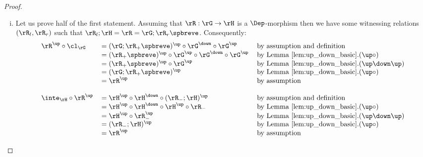 \documentclass{article}
\begin{document}
  \begin{proof}
  \item
  \begin{enumerate}[i.]
  \item
  Let us prove half of the first statement. Assuming that $\rR : \rG \to \rH$ is a $\Dep$-morphism then we have some witnessing relations $(\rR_l,\rR_r)$ such that $\rR_l ; \rH = \rR = \rG ; \rR_r\spbreve$. Consequently:
  \[
  \begin{tabular}{lll}
  $\rR^\up \circ \cl_\rG$
  &
  $= (\rG ; \rR_+\spbreve)^\up \circ \rG^\down \circ \rG^\up$
  & by assumption and definition
  \\&
  $= (\rR_+\spbreve)^\up \circ \rG^\up \circ \rG^\down \circ \rG^\up$
  & by Lemma \ref{lem:up_down_basic}.$(\up\circ)$
  \\&
  $= (\rR_+\spbreve)^\up \circ \rG^\up$
  & by Lemma \ref{lem:up_down_basic}.$(\up\down\up)$
  \\&
  $= (\rG ; \rR_+\spbreve)^\up$
  & by Lemma \ref{lem:up_down_basic}.$(\up\circ)$
  \\&
  $= \rR^\up$
  & by assumption
  \\
  \\
  $\inte_\rH \circ \rR^\up$
  &
  $= \rH^\up \circ \rH^\down \circ (\rR_- ; \rH)^\up$
  & by assumption and definition
  \\&
  $= \rH^\up \circ \rH^\down \circ \rH^\up \circ \rR_-$
  & by Lemma \ref{lem:up_down_basic}.$(\up\circ)$
  \\&
  $= \rH^\up \circ \rR_-^\up$
  & by Lemma \ref{lem:up_down_basic}.$(\up\down\up)$
  \\&
  $= (\rR_- ; \rH)^\up$
  & by Lemma \ref{lem:up_down_basic}.$(\up\circ)$
  \\&
  $= \rR^\up$
  & by assumption
  \end{tabular}
  \]
  

\end{enumerate}
\end{proof}
\end{document}
